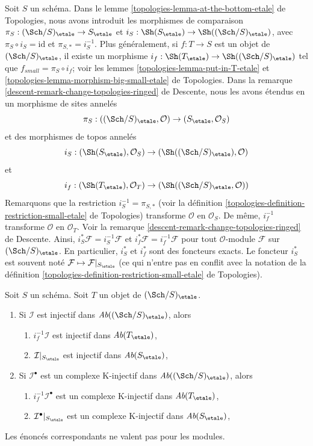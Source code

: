 \noindent
Soit $S$ un schéma. Dans le
lemme \ref{topologies-lemma-at-the-bottom-etale} de Topologies,
nous avons introduit les morphismes de comparaison
$\pi_S : (\Sch/S)_\etale \to S_\etale$ et
$i_S : \Sh(S_\etale) \to \Sh((\Sch/S)_\etale)$,
avec $\pi_S \circ i_S = \text{id}$ et $\pi_{S, *} = i_S^{-1}$.
Plus généralement, si $f : T \to S$ est un objet de $(\Sch/S)_\etale$,
il existe un morphisme $i_f : \Sh(T_\etale) \to \Sh((\Sch/S)_\etale)$
tel que $f_{small} = \pi_S \circ i_f$; voir les
lemmes \ref{topologies-lemma-put-in-T-etale} et
\ref{topologies-lemma-morphism-big-small-etale} de Topologies. Dans la
remarque \ref{descent-remark-change-topologies-ringed} de Descente,
nous les avons étendus en un morphisme de sites annelés
$$
\pi_S : ((\Sch/S)_\etale, \mathcal{O}) \to (S_\etale, \mathcal{O}_S)
$$
et des morphismes de topos annelés
$$
i_S : (\Sh(S_\etale), \mathcal{O}_S) \to (\Sh((\Sch/S)_\etale), \mathcal{O})
$$
et
$$
i_f : (\Sh(T_\etale), \mathcal{O}_T) \to (\Sh((\Sch/S)_\etale, \mathcal{O}))
$$
Remarquons que la restriction $i_S^{-1} = \pi_{S, *}$ (voir la
définition \ref{topologies-definition-restriction-small-etale} de Topologies)
transforme $\mathcal{O}$ en $\mathcal{O}_S$.
De même, $i_f^{-1}$ transforme $\mathcal{O}$ en $\mathcal{O}_T$.
Voir la remarque \ref{descent-remark-change-topologies-ringed} de Descente.
Ainsi, $i_S^*\mathcal{F} = i_S^{-1}\mathcal{F}$ et
$i_f^*\mathcal{F} = i_f^{-1}\mathcal{F}$ pour tout $\mathcal{O}$-module
$\mathcal{F}$ sur $(\Sch/S)_\etale$. En particulier, $i_S^*$ et $i_f^*$
sont des foncteurs exacts. Le foncteur $i_S^*$ est souvent noté
$\mathcal{F} \mapsto \mathcal{F}|_{S_\etale}$ (ce qui n'entre pas
en conflit avec la notation de la
définition \ref{topologies-definition-restriction-small-etale} de Topologies).

\begin{lemma}
\label{lemma-compare-injectives}
Soit $S$ un schéma. Soit $T$ un objet de $(\Sch/S)_\etale$.
\begin{enumerate}
\item Si $\mathcal{I}$ est injectif dans $\textit{Ab}((\Sch/S)_\etale)$, alors
\begin{enumerate}
\item $i_f^{-1}\mathcal{I}$ est injectif dans $\textit{Ab}(T_\etale)$,
\item $\mathcal{I}|_{S_\etale}$ est injectif dans $\textit{Ab}(S_\etale)$,
\end{enumerate}
\item Si $\mathcal{I}^\bullet$ est un complexe K-injectif
dans $\textit{Ab}((\Sch/S)_\etale)$, alors
\begin{enumerate}
\item $i_f^{-1}\mathcal{I}^\bullet$ est un complexe K-injectif dans
$\textit{Ab}(T_\etale)$,
\item $\mathcal{I}^\bullet|_{S_\etale}$ est un complexe K-injectif dans
$\textit{Ab}(S_\etale)$,
\end{enumerate}
\end{enumerate}
Les énoncés correspondants ne valent pas pour les modules.
\end{lemma}

